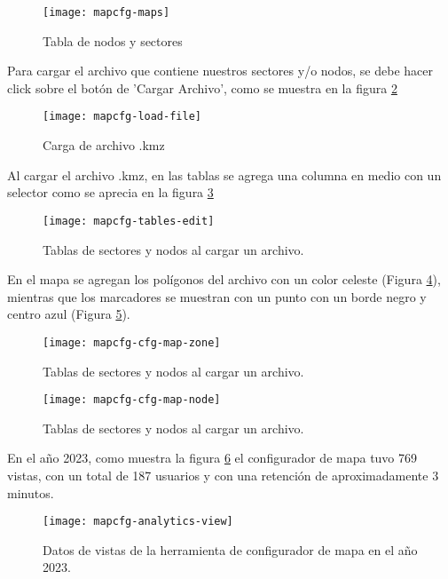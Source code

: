 \begin{figure}[H]
	\centering
	\texttt{[image: mapcfg-maps]}
	\caption{\label{fig:mapcfg-maps} Tabla de nodos y sectores}
\end{figure}

Para cargar el archivo que contiene nuestros sectores y/o nodos, se debe hacer click sobre el botón de 'Cargar Archivo', como se muestra en la figura \ref{fig:mapcfg-load-file}

\begin{figure}[H]
	\centering
	\texttt{[image: mapcfg-load-file]}
	\caption{\label{fig:mapcfg-load-file} Carga de archivo .kmz}
\end{figure}

Al cargar el archivo .kmz, en las tablas se agrega una columna en medio con un selector como se aprecia en la figura \ref{fig:mapcfg-tables-edit}

\begin{figure}[H]
	\centering
	\texttt{[image: mapcfg-tables-edit]}
	\caption{\label{fig:mapcfg-tables-edit} Tablas de sectores y nodos al cargar un archivo.}
\end{figure}

En el mapa se agregan los polígonos del archivo con un color celeste (Figura \ref{fig:mapcfg-cfg-map-zone}), mientras que los marcadores se muestran con un punto con un borde negro y centro azul (Figura \ref{fig:mapcfg-cfg-map-node}).

\begin{figure}[H]
	\centering
	\texttt{[image: mapcfg-cfg-map-zone]}
	\caption{\label{fig:mapcfg-cfg-map-zone} Tablas de sectores y nodos al cargar un archivo.}
\end{figure}

\begin{figure}[H]
	\centering
	\texttt{[image: mapcfg-cfg-map-node]}
	\caption{\label{fig:mapcfg-cfg-map-node} Tablas de sectores y nodos al cargar un archivo.}
\end{figure}


En el año 2023, como muestra la figura \ref{fig:mapcfg-analytics-view} el configurador de mapa tuvo 769 vistas, con un total de 187 usuarios y con una retención de aproximadamente 3 minutos.
\begin{figure}[H]
	\centering
	\texttt{[image: mapcfg-analytics-view]}
	\caption{\label{fig:mapcfg-analytics-view} Datos de vistas de la herramienta de configurador de mapa en el año 2023.}
\end{figure}

